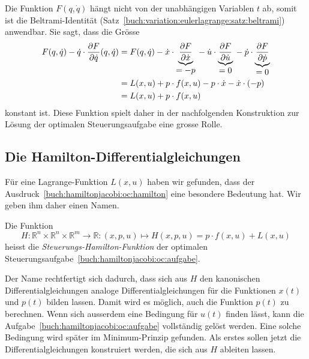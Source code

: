 Die Funktion $F(q,\dot{q})$ hängt nicht von der unabhängigen
Variablen $t$ ab, somit ist die Beltrami-Identität
(Satz~\ref{buch:variation:eulerlagrange:satz:beltrami})
anwendbar.
Sie sagt, dass die Grösse
\begin{align}
F(q,\dot{q})
-
\dot{q}\cdot\frac{\partial F}{\partial\dot{q}}(q,\dot{q})
&=
F(q,\dot{q})
-
\dot{x}\cdot
\underbrace{
\frac{\partial F}{\partial\dot{x}}
}_{\displaystyle=-p}
\mathstrut-
\dot{u}\cdot
\underbrace{
\frac{\partial F}{\partial\dot{u}}
}_{\displaystyle=0}
\mathstrut-
\dot{p}\cdot
\underbrace{
\frac{\partial F}{\partial\dot{p}}
}_{\displaystyle=0}
\notag
\\
&=
L(x,u)+p\cdot f(x,u)-p\cdot\dot{x}
-
\dot{x}\cdot
(-p)
\notag
\\
&=
L(x,u) + p\cdot f(x,u)
\label{buch:hamiltonjacobi:oc:hamilton}
\end{align}
konstant ist.
Diese Funktion spielt daher in der nachfolgenden Konstruktion zur
Lösung der optimalen Steuerungsaufgabe eine grosse Rolle.

%
%
\subsection{Die Hamilton-Differentialgleichungen
\label{buch:hamiltonjacobi:oc:subsection:hamilton}}
Für eine Lagrange-Funktion $L(x,u)$ haben wir gefunden, dass der
Ausdruck~\eqref{buch:hamiltonjacobi:oc:hamilton} eine besondere
Bedeutung hat.
Wir geben ihm daher einen Namen.

\begin{definition}
Die Funktion
\[
H
\colon
\mathbb{R}^n\times\mathbb{R}^n\times\mathbb{R}^m
\to
\mathbb{R}
:
(x,p,u)
\mapsto
H(x,p,u)
=
p\cdot f(x,u) + L(x,u)
\]
heisst die {\em Steuerungs-Hamilton-Funktion}
%
der optimalen Steuerungsaufgabe~\ref{buch:hamiltonjacobi:oc:aufgabe}.
\end{definition}

Der Name rechtfertigt sich dadurch, dass sich aus $H$
den kanonischen Differentialgleichungen analoge
Differentialgleichungen für die Funktionen $x(t)$ und $p(t)$ bilden
lassen.
Damit wird es möglich, auch die Funktion $p(t)$ zu berechnen.
Wenn sich ausserdem eine Bedingung für $u(t)$ finden lässt, kann
die Aufgabe~\ref{buch:hamiltonjacobi:oc:aufgabe}
vollständig gelöst werden.
Eine solche Bedingung wird später im Minimum-Prinzip gefunden.
Als erstes sollen jetzt die Differentialgleichungen konstruiert
werden, die sich aus $H$ ableiten lassen.


